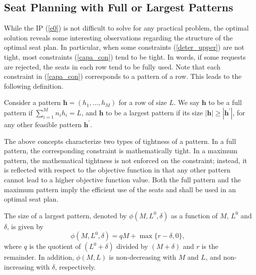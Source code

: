 \subsection{Seat Planning with Full or Largest Patterns}\label{seat_planning_full_largest}
While the IP (\ref{e0}) is not difficult to solve for any practical problem, the optimal solution reveals some interesting observations regarding the structure  of the optimal seat plan. In particular, when some constraints (\ref{deter_upper}) are not tight, most constraints (\ref{capa_con}) tend to be tight. In words, if some requests are rejected, the seats in each row tend to be fully used. Note that each constraint in (\ref{capa_con}) corresponds to a pattern of a row.
This leads to the following definition.

\begin{definition}
Consider a pattern $\bm{h} = (h_1, \ldots, h_M)$ for a row of size $L$. We say $\bm{h}$ to be a full pattern if $\sum_{i=1}^{M} n_i h_i = L$, and $\bm{h}$ to be a largest pattern if its size $|\bm{h}| \geq |\bm{h}^{\prime}|$, for any other feasible pattern $\bm{h}^{\prime}$.
\end{definition}

The above concepts characterize two types of tightness of a pattern. In a full pattern, the corresponding constraint is mathematically tight. In a maximum pattern, the mathematical tightness is not enforced on the constraint; instead, it is reflected with respect to the objective function in that any other pattern cannot lead to a higher objective function value. Both the full pattern and the maximum pattern imply the efficient use of the seats and shall be used in an optimal seat plan.


\begin{prop}\label{lem_pattern}
The size of a largest pattern, denoted by $\phi(M, L^{0}, \delta)$ as a function of $M$, $L^{0}$ and $\delta$, is given by $$\phi(M, L^{0}, \delta) = q M + \max\{r-\delta, 0\},$$ where $q$ is the quotient of $(L^{0} + \delta)$ divided by $(M+\delta)$ and $r$ is the remainder. In addition, $\phi(M,L)$ is non-decreasing with $M$ and $L$, and non-increasing with $\delta$, respectively. 
\end{prop}

